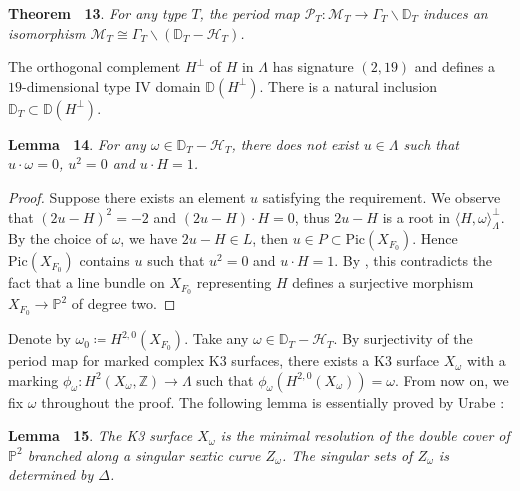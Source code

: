 \documentclass[
]{article}
\begin{document}
\textbf{Theorem~ 13}. \emph{\label{thm: open} For any type \(T\), the
period map
\(\mathscr{P}_T\colon\mathcal{M}_T\to\Gamma_T\backslash\mathbb{D}_T\)
induces an isomorphism
\(\mathcal{M}_T \cong \Gamma_T\backslash (\mathbb{D}_T-\mathcal{H}_T)\).}

The orthogonal complement \(H^\perp\) of \(H\) in \(\Lambda\) has
signature \((2,19)\) and defines a \(19\)-dimensional type IV domain
\(\mathbb{D}(H^\perp)\). There is a natural inclusion
\(\mathbb{D}_T \subset \mathbb{D}(H^\perp)\).

\textbf{Lemma~ 14}. \emph{\label{lem: no calH'_T} For any
\(\omega\in \mathbb{D}_T-\mathcal{H}_T\), there does not exist
\(u\in \Lambda\) such that \(u\cdot\omega=0\), \(u^2=0\) and
\(u\cdot H=1\).}

\emph{Proof.} Suppose there exists an element \(u\) satisfying the
requirement. We observe that \((2u-H)^2=-2\) and \((2u-H)\cdot H=0\),
thus \(2u-H\) is a root in \(\langle H,\omega \rangle^\perp_{\Lambda}\).
By the choice of \(\omega\), we have \(2u-H\in L\), then
\(u\in P \subset \mathrm{Pic}(X_{F_0})\). Hence
\(\mathrm{Pic}(X_{F_0})\) contains \(u\) such that \(u^2=0\) and
\(u\cdot H=1\). By \cite[Proposition 1.7]{urabe1988combinations}, this
contradicts the fact that a line bundle on \(X_{F_0}\) representing
\(H\) defines a surjective morphism \(X_{F_0}\to \mathbb{P}^2\) of
degree two.~◻

Denote by \(\omega_0\coloneqq H^{2,0}(X_{F_0})\). Take any
\(\omega\in\mathbb{D}_T-\mathcal{H}_T\). By surjectivity of the period
map for marked complex K3 surfaces, there exists a K3 surface
\(X_\omega\) with a marking
\(\phi_\omega\colon H^2(X_\omega,\mathbb{Z})\to \Lambda\) such that
\(\phi_\omega(H^{2,0}(X_\omega))=\omega\). From now on, we fix
\(\omega\) throughout the proof. The following lemma is essentially
proved by Urabe \cite[Theorem 1.16]{urabe1988combinations}:

\textbf{Lemma~ 15}. \emph{\label{lem: X_omega determines Z(F)} The K3
surface \(X_\omega\) is the minimal resolution of the double cover of
\(\mathbb{P}^2\) branched along a singular sextic curve \(Z_\omega\).
The singular sets of \(Z_\omega\) is determined by \(\Delta\).}
\end{document}
